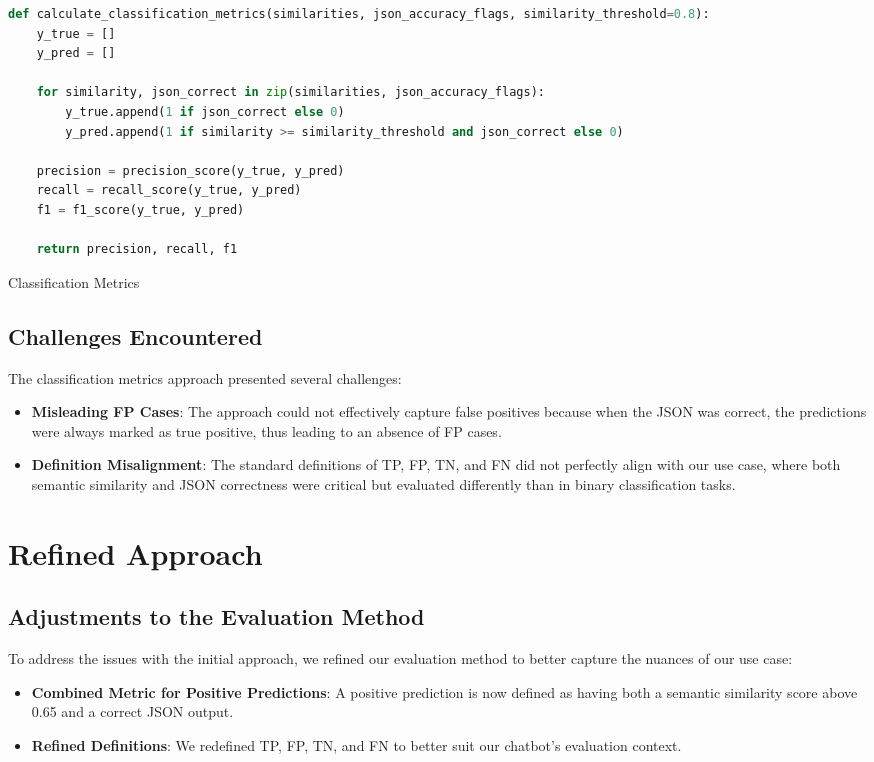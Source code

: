 \begin{Listing}
    \begin{lstlisting}[language=Python]
def calculate_classification_metrics(similarities, json_accuracy_flags, similarity_threshold=0.8):
    y_true = []
    y_pred = []

    for similarity, json_correct in zip(similarities, json_accuracy_flags):
        y_true.append(1 if json_correct else 0)
        y_pred.append(1 if similarity >= similarity_threshold and json_correct else 0)

    precision = precision_score(y_true, y_pred)
    recall = recall_score(y_true, y_pred)
    f1 = f1_score(y_true, y_pred)

    return precision, recall, f1
  \end{lstlisting}
    \caption{Classification Metrics}
    \label{lst:similarity}
\end{Listing}

\subsection{Challenges Encountered}

The classification metrics approach presented several challenges:
\begin{itemize}
    \item \textbf{Misleading FP Cases}: The approach could not effectively capture false positives because when the JSON was correct, the predictions were always marked as true positive, thus leading to an absence of FP cases.
    \item \textbf{Definition Misalignment}: The standard definitions of TP, FP, TN, and FN did not perfectly align with our use case, where both semantic similarity and JSON correctness were critical but evaluated differently than in binary classification tasks.
\end{itemize}

\section{Refined Approach}

\subsection{Adjustments to the Evaluation Method}

To address the issues with the initial approach, we refined our evaluation method to better capture the nuances of our use case:
\begin{itemize}
    \item \textbf{Combined Metric for Positive Predictions}: A positive prediction is now defined as having both a semantic similarity score above 0.65 and a correct JSON output.
    \item \textbf{Refined Definitions}: We redefined TP, FP, TN, and FN to better suit our chatbot's evaluation context.
\end{itemize}

